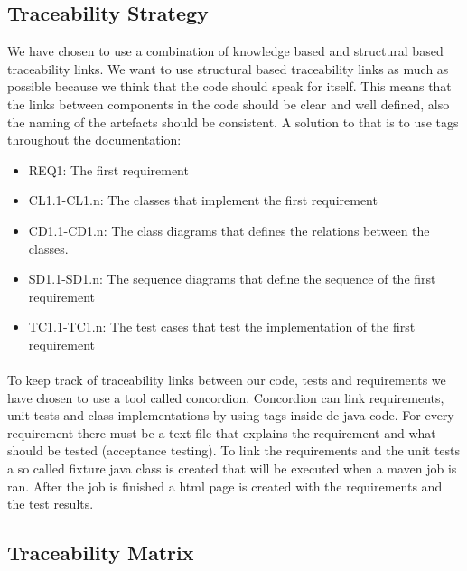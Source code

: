 \documentclass{article}
\begin{document}
\subsection{Traceability Strategy}
We have chosen to use a combination of knowledge based and structural based traceability links. We want to use structural based traceability links as much as possible because we think that the code should speak for itself. This means that the links between components in the code should be clear and well defined, also the naming of the artefacts should be consistent. A solution to that is to use tags throughout the documentation:
\begin{itemize}
    \item REQ1: The first requirement
    \item CL1.1-CL1.n: The classes that implement the first requirement
    \item CD1.1-CD1.n: The class diagrams that defines the relations between the classes.
    \item SD1.1-SD1.n: The sequence diagrams that define the sequence of the first requirement
    \item TC1.1-TC1.n: The test cases that test the implementation of the first requirement 
\end{itemize}

\paragraph{} To keep track of traceability links between our code, tests and requirements we have chosen to use a tool called concordion. Concordion can link requirements, unit tests and class implementations by using tags inside de java code. For every requirement there must be a text file that explains the requirement and what should be tested (acceptance testing). To link the requirements and the unit tests a so called fixture java class is created that will be executed when a maven job is ran. After the job is finished a html page is created with the requirements and the test results.

\newpage
\subsection{Traceability Matrix}
\end{document}
